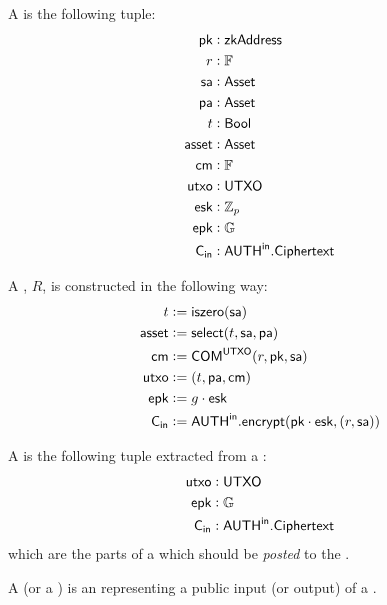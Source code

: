 \begin{definition}
    A \Receiver{} is the following tuple:
    \begin{align*}
        {\textsf{pk}}    &: {\textsf{zkAddress}} \\
        r      &: {\mathbb{F}} \\
        {\textsf{sa}}    &: {\textsf{Asset}} \\
        {\textsf{pa}}    &: {\textsf{Asset}} \\
        t      &: {\textsf{Bool}} \\
        {\textsf{asset}} &: {\textsf{Asset}} \\
        {\textsf{cm}}    &: {\mathbb{F}} \\
        {\textsf{utxo}}  &: {\textsf{UTXO}} \\
        {\textsf{esk}}   &: {\mathbb{Z}}_p \\
        {\textsf{epk}}   &: {\mathbb{G}} \\
        {\textsf{C}_\textsf{in}}   &: {{\textsf{AUTH}}^\textsf{in}}.{\textsf{Ciphertext}}
    \end{align*}
    
    A \Receiver{}, $R$, is constructed in the following way:
    \begin{align*}
        t      &:= {\textsf{iszero}}({\textsf{sa}}) \\
        {\textsf{asset}} &:= {\textsf{select}}(t, {\textsf{sa}}, {\textsf{pa}}) \\
        {\textsf{cm}}    &:= {\textsf{COM}}^{{\textsf{UTXO}}}(r, {\textsf{pk}}, {\textsf{sa}}) \\
        {\textsf{utxo}}  &:= (t, {\textsf{pa}}, {\textsf{cm}}) \\
        {\textsf{epk}}   &:= g \cdot {\textsf{esk}} \\
        {\textsf{C}_\textsf{in}}   &:= {{\textsf{AUTH}}^\textsf{in}}.{\textsf{encrypt}}({\textsf{pk}} \cdot {\textsf{esk}}, (r, {\textsf{sa}}))
    \end{align*}
\end{definition}

\begin{definition}
    A \ReceiverPost{} is the following tuple extracted from a \Receiver{}:
    \begin{align*}
        {\textsf{utxo}} &: {\textsf{UTXO}} \\
        {\textsf{epk}}  &: {\mathbb{G}} \\
        {\textsf{C}_\textsf{in}}  &: {{\textsf{AUTH}}^\textsf{in}}.{\textsf{Ciphertext}}
    \end{align*}
    which are the parts of a \Receiver{} which should be \emph{posted} to the \Ledger{}.
\end{definition}

\begin{definition}
    A \Source{} (or a \Sink{}) is an \Asset{} representing a public input (or output) of a \Transfer{}.
\end{definition}

